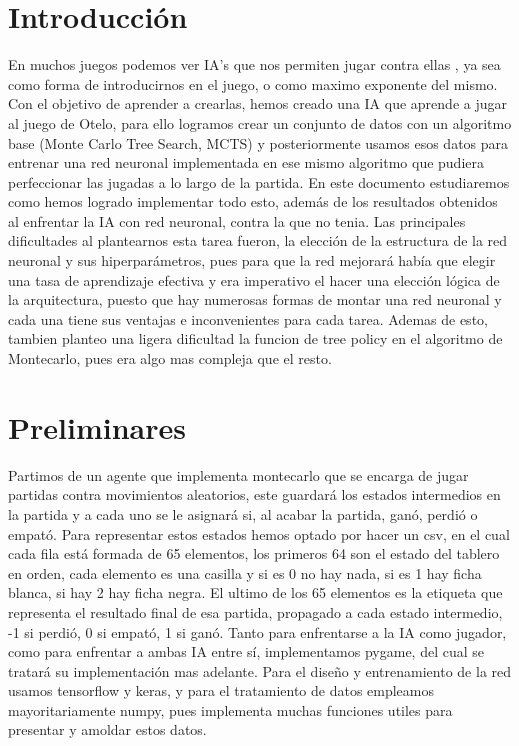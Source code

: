 \documentclass[conference]{IEEEtran}
\begin{document}
\section{Introducción}
En muchos juegos podemos ver IA's que nos permiten jugar contra ellas \cite{russell2020}, ya sea como forma de introducirnos en el juego, o como maximo exponente del mismo.
Con el objetivo de aprender a crearlas, hemos creado una IA que aprende a jugar al juego de Otelo, para ello logramos crear un conjunto de datos con un
algoritmo base (Monte Carlo Tree Search, MCTS) y posteriormente usamos esos datos para entrenar una red neuronal implementada en ese mismo algoritmo que pudiera perfeccionar las jugadas a lo largo de la 
partida. En este documento estudiaremos como hemos logrado implementar todo esto, además de los resultados obtenidos al enfrentar la IA con red neuronal,
contra la que no tenia. Las principales dificultades al plantearnos esta tarea fueron, la elección de la estructura de la red neuronal y sus hiperparámetros, pues para
que la red mejorará había que elegir una tasa de aprendizaje efectiva y era imperativo el hacer una elección lógica de la arquitectura, puesto que hay numerosas
formas de montar una red neuronal y cada una tiene sus ventajas e inconvenientes para cada tarea. Ademas de esto, tambien planteo una ligera dificultad la funcion
de tree policy en el algoritmo de Montecarlo, pues era algo mas compleja que el resto.
\section{Preliminares}
Partimos de un agente que implementa montecarlo que se encarga de jugar partidas contra movimientos aleatorios, este guardará los estados intermedios 
en la partida y a cada uno se le asignará si, al acabar la partida, ganó, perdió o empató. Para representar estos estados hemos optado por hacer un csv, 
en el cual cada fila está formada de 65 elementos, los primeros 64 son el estado del tablero en orden, cada elemento es una casilla y si es 0 no hay nada,
si es 1 hay ficha blanca, si hay 2 hay ficha negra. El ultimo de los 65 elementos es la etiqueta que representa el resultado final de esa partida, propagado a cada estado intermedio,
-1 si perdió, 0 si empató, 1 si ganó. Tanto para enfrentarse a la IA como jugador, como para enfrentar a ambas IA entre sí, implementamos pygame, del cual se tratará su implementación mas adelante.
Para el diseño y entrenamiento de la red usamos tensorflow y keras, y para el tratamiento de datos empleamos mayoritariamente numpy, pues implementa muchas funciones utiles para presentar y amoldar
estos datos.
\end{document}
